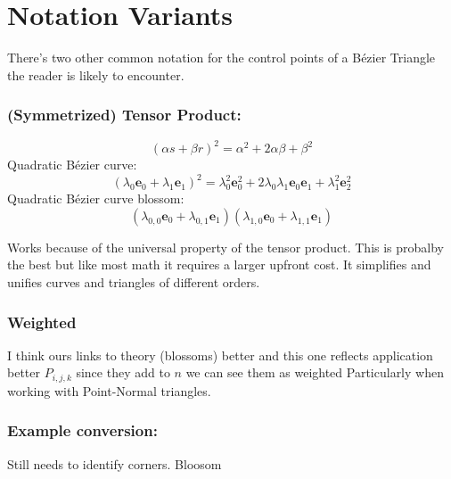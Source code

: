 
\section{Notation Variants}
There's two other common notation for the control points of a Bézier Triangle the reader is likely to encounter.

\subsubsection{(Symmetrized) Tensor Product:}
\[(\alpha s + \beta r)^2 = \alpha^2+2\alpha\beta + \beta^2\]
Quadratic Bézier curve:
\[(\lambda_0\mathbf{e}_0+\lambda_1\mathbf{e}_1)^2 = \lambda_0^2\mathbf{e}_0^2+2\lambda_0\lambda_1\mathbf{e}_0\mathbf{e}_1+\lambda_1^2\mathbf{e}_2^2\]
Quadratic Bézier curve blossom:
\[(\lambda_{0,0}\mathbf{e}_0+\lambda_{0,1}\mathbf{e}_1)(\lambda_{1,0}\mathbf{e}_0+\lambda_{1,1}\mathbf{e}_1)\]

Works because of the universal property of the tensor product.
This is probalby the best but like most math it requires a larger upfront cost.
It simplifies and unifies curves and triangles of different orders.

\subsubsection{Weighted}
I think ours links to theory (blossoms) better and this one reflects application better
$P_{i,j,k}$ since they add to $n$ we can see them as weighted 
Particularly when working with Point-Normal triangles.

\subsubsection{Example conversion:}
Still needs to identify corners.
Bloosom 

% 
